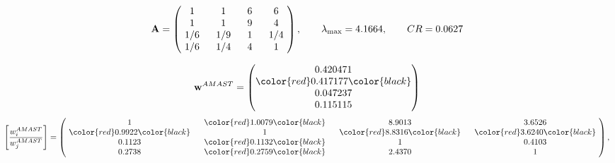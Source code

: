 \begin{example}
\begin{equation*}
\mathbf{A} =
\begin{pmatrix}
$\,\,$ 1 $\,\,$ & $\,\,$1$\,\,$ & $\,\,$6$\,\,$ & $\,\,$6 $\,\,$ \\
$\,\,$ 1 $\,\,$ & $\,\,$ 1 $\,\,$ & $\,\,$9$\,\,$ & $\,\,$4 $\,\,$ \\
$\,\,$ 1/6$\,\,$ & $\,\,$ 1/9$\,\,$ & $\,\,$ 1 $\,\,$ & $\,\,$ 1/4 $\,\,$ \\
$\,\,$ 1/6$\,\,$ & $\,\,$ 1/4$\,\,$ & $\,\,$4$\,\,$ & $\,\,$ 1  $\,\,$ \\
\end{pmatrix},
\qquad
\lambda_{\max} =
4.1664,
\qquad
CR = 0.0627
\end{equation*}

\begin{equation*}
\mathbf{w}^{AMAST} =
\begin{pmatrix}
0.420471\\
\color{red} 0.417177\color{black} \\
0.047237\\
0.115115
\end{pmatrix}\end{equation*}
\begin{equation*}
\left[ \frac{{w}^{AMAST}_i}{{w}^{AMAST}_j} \right] =
\begin{pmatrix}
$\,\,$ 1 $\,\,$ & $\,\,$\color{red} 1.0079\color{black} $\,\,$ & $\,\,$8.9013$\,\,$ & $\,\,$3.6526$\,\,$ \\
$\,\,$\color{red} 0.9922\color{black} $\,\,$ & $\,\,$ 1 $\,\,$ & $\,\,$\color{red} 8.8316\color{black} $\,\,$ & $\,\,$\color{red} 3.6240\color{black}   $\,\,$ \\
$\,\,$0.1123$\,\,$ & $\,\,$\color{red} 0.1132\color{black} $\,\,$ & $\,\,$ 1 $\,\,$ & $\,\,$0.4103 $\,\,$ \\
$\,\,$0.2738$\,\,$ & $\,\,$\color{red} 0.2759\color{black} $\,\,$ & $\,\,$2.4370$\,\,$ & $\,\,$ 1  $\,\,$ \\
\end{pmatrix},
\end{equation*}


\end{example}
